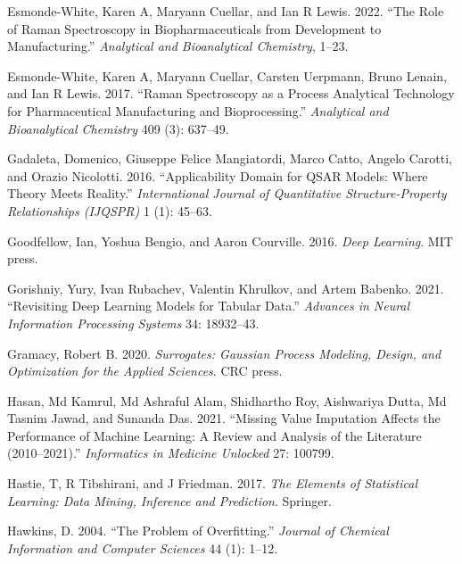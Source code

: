 \documentclass[
  letterpaper,
  DIV=11,
  numbers=noendperiod]{scrartcl}
\newlength{\cslhangindent}
\newlength{\cslentryspacingunit} %
\newenvironment{CSLReferences}[2] %
 {%
  \setlength{\parindent}{0pt}
  \ifodd #1
  \let\oldpar\par
  \def\par{\hangindent=\cslhangindent\oldpar}
  \fi
  \setlength{\parskip}{#2\cslentryspacingunit}
 }%
 {}
\begin{document}
\begin{CSLReferences}{1}{0}
\leavevmode{}%
Esmonde-White, Karen A, Maryann Cuellar, and Ian R Lewis. 2022. {``The
Role of Raman Spectroscopy in Biopharmaceuticals from Development to
Manufacturing.''} \emph{Analytical and Bioanalytical Chemistry}, 1--23.

\leavevmode{}%
Esmonde-White, Karen A, Maryann Cuellar, Carsten Uerpmann, Bruno Lenain,
and Ian R Lewis. 2017. {``Raman Spectroscopy as a Process Analytical
Technology for Pharmaceutical Manufacturing and Bioprocessing.''}
\emph{Analytical and Bioanalytical Chemistry} 409 (3): 637--49.

\leavevmode{}%
Gadaleta, Domenico, Giuseppe Felice Mangiatordi, Marco Catto, Angelo
Carotti, and Orazio Nicolotti. 2016. {``Applicability Domain for QSAR
Models: Where Theory Meets Reality.''} \emph{International Journal of
Quantitative Structure-Property Relationships (IJQSPR)} 1 (1): 45--63.

\leavevmode{}%
Goodfellow, Ian, Yoshua Bengio, and Aaron Courville. 2016. \emph{Deep
Learning}. MIT press.

\leavevmode{}%
Gorishniy, Yury, Ivan Rubachev, Valentin Khrulkov, and Artem Babenko.
2021. {``Revisiting Deep Learning Models for Tabular Data.''}
\emph{Advances in Neural Information Processing Systems} 34: 18932--43.

\leavevmode{}%
Gramacy, Robert B. 2020. \emph{Surrogates: Gaussian Process Modeling,
Design, and Optimization for the Applied Sciences}. CRC press.

\leavevmode{}%
Hasan, Md Kamrul, Md Ashraful Alam, Shidhartho Roy, Aishwariya Dutta, Md
Tasnim Jawad, and Sunanda Das. 2021. {``Missing Value Imputation Affects
the Performance of Machine Learning: A Review and Analysis of the
Literature (2010--2021).''} \emph{Informatics in Medicine Unlocked} 27:
100799.

\leavevmode{}%
Hastie, T, R Tibshirani, and J Friedman. 2017. \emph{{The Elements of
Statistical Learning: Data Mining, Inference and Prediction}}. Springer.

\leavevmode{}%
Hawkins, D. 2004. {``The Problem of Overfitting.''} \emph{Journal of
Chemical Information and Computer Sciences} 44 (1): 1--12.


\end{CSLReferences}
\end{document}
